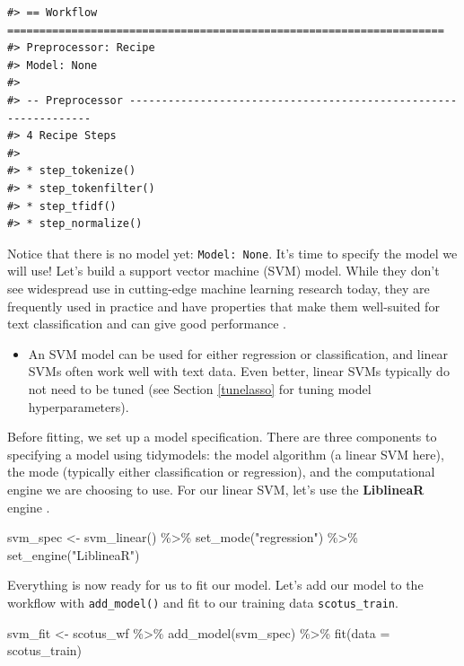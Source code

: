 \documentclass[
]{krantz}
\makeatletter
\newenvironment{Shaded}{\begin{snugshade}}{\end{snugshade}}
\newcommand{\AttributeTok}[1]{\textcolor[rgb]{0.77,0.63,0.00}{#1}}
\newcommand{\FunctionTok}[1]{\textcolor[rgb]{0.00,0.00,0.00}{#1}}
\newcommand{\NormalTok}[1]{#1}
\newcommand{\OtherTok}[1]{\textcolor[rgb]{0.56,0.35,0.01}{#1}}
\newcommand{\SpecialCharTok}[1]{\textcolor[rgb]{0.00,0.00,0.00}{#1}}
\newcommand{\StringTok}[1]{\textcolor[rgb]{0.31,0.60,0.02}{#1}}
\newenvironment{kframe}{%
\medskip{}
\setlength{\fboxsep}{.8em}
 \def\at@end@of@kframe{}%
 \ifinner\ifhmode%
  \def\at@end@of@kframe{\end{minipage}}%
  \begin{minipage}{\columnwidth}%
 \fi\fi%
 \def\FrameCommand##1{\hskip\@totalleftmargin \hskip-\fboxsep
 \colorbox{shadecolor}{##1}\hskip-\fboxsep
     \hskip-\linewidth \hskip-\@totalleftmargin \hskip\columnwidth}%
 \MakeFramed {\advance\hsize-\width
   \@totalleftmargin\z@ \linewidth\hsize
   \@setminipage}}%
 {\par\unskip\endMakeFramed%
 \at@end@of@kframe}
\renewenvironment{Shaded}{\begin{kframe}}{\end{kframe}}
\newenvironment{rmdblock}[1]
  {\begin{shaded*}
  \begin{itemize}[left = -1cm, labelsep = 1cm]
  \renewcommand{\labelitemi}{
    \raisebox{-.7\height}[0pt][0pt]{
      {\setkeys{Gin}{width=3em,keepaspectratio}\texttt{[image: images/\#1]}}
    }
  }
 
  \item
  }
  {
  \end{itemize}
  \end{shaded*}
  }
\newenvironment{rmdnote}
  {\begin{rmdblock}{note}}
  {\end{rmdblock}}
\makeatother
\begin{document}
\begin{verbatim}
#> == Workflow ====================================================================
#> Preprocessor: Recipe
#> Model: None
#> 
#> -- Preprocessor ----------------------------------------------------------------
#> 4 Recipe Steps
#> 
#> * step_tokenize()
#> * step_tokenfilter()
#> * step_tfidf()
#> * step_normalize()
\end{verbatim}

Notice that there is no model yet: \texttt{Model:\ None}. It's time to specify the model we will use! Let's build a support vector machine (SVM) model. While they don't see widespread use in cutting-edge machine learning research today, they are frequently used in practice and have properties that make them well-suited for text classification \citep{Joachims1998} and can give good performance \citep{Vantu2016}.

\begin{rmdnote}
An SVM model can be used for either regression or classification, and linear SVMs often work well with text data. Even better, linear SVMs typically do not need to be tuned (see Section \ref{tunelasso} for tuning model hyperparameters).
\end{rmdnote}

Before fitting, we set up a model specification. There are three components to specifying a model using tidymodels: the model algorithm (a linear SVM here), the mode (typically either classification or regression), and the computational engine we are choosing to use. For our linear SVM, let's use the \textbf{LiblineaR} engine \citep{R-LiblineaR}.

\begin{Shaded}
\begin{Highlighting}[]
\NormalTok{svm\_spec }\OtherTok{\textless{}{-}} \FunctionTok{svm\_linear}\NormalTok{() }\SpecialCharTok{\%\textgreater{}\%}
  \FunctionTok{set\_mode}\NormalTok{(}\StringTok{"regression"}\NormalTok{) }\SpecialCharTok{\%\textgreater{}\%}
  \FunctionTok{set\_engine}\NormalTok{(}\StringTok{"LiblineaR"}\NormalTok{)}
\end{Highlighting}
\end{Shaded}

Everything is now ready for us to fit our model. Let's add our model to the workflow with \texttt{add\_model()} and fit to our training data \texttt{scotus\_train}.

\begin{Shaded}
\begin{Highlighting}[]
\NormalTok{svm\_fit }\OtherTok{\textless{}{-}}\NormalTok{ scotus\_wf }\SpecialCharTok{\%\textgreater{}\%}
  \FunctionTok{add\_model}\NormalTok{(svm\_spec) }\SpecialCharTok{\%\textgreater{}\%}
  \FunctionTok{fit}\NormalTok{(}\AttributeTok{data =}\NormalTok{ scotus\_train)}
\end{Highlighting}
\end{Shaded}
\end{document}
